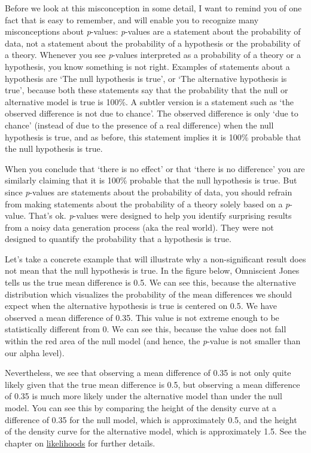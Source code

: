 \documentclass[
  oneside]{krantz}
\begin{document}
Before we look at this misconception in some detail, I want to remind you of one fact that is easy to remember, and will enable you to recognize many misconceptions about \emph{p}-values: \emph{p}-values are a statement about the probability of data, not a statement about the probability of a hypothesis or the probability of a theory. Whenever you see \emph{p}-values interpreted as a probability of a theory or a hypothesis, you know something is not right. Examples of statements about a hypothesis are `The null hypothesis is true', or `The alternative hypothesis is true', because both these statements say that the probability that the null or alternative model is true is 100\%. A subtler version is a statement such as `the observed difference is not due to chance'. The observed difference is only `due to chance' (instead of due to the presence of a real difference) when the null hypothesis is true, and as before, this statement implies it is 100\% probable that the null hypothesis is true.

When you conclude that `there is no effect' or that `there is no difference' you are similarly claiming that it is 100\% probable that the null hypothesis is true. But since \emph{p}-values are statements about the probability of data, you should refrain from making statements about the probability of a theory solely based on a \emph{p}-value. That's ok. \emph{p}-values were designed to help you identify surprising results from a noisy data generation process (aka the real world). They were not designed to quantify the probability that a hypothesis is true.

Let's take a concrete example that will illustrate why a non-significant result does not mean that the null hypothesis is true. In the figure below, Omniscient Jones tells us the true mean difference is 0.5. We can see this, because the alternative distribution which visualizes the probability of the mean differences we should expect when the alternative hypothesis is true is centered on 0.5. We have observed a mean difference of 0.35. This value is not extreme enough to be statistically different from 0. We can see this, because the value does not fall within the red area of the null model (and hence, the \emph{p}-value is not smaller than our alpha level).

Nevertheless, we see that observing a mean difference of 0.35 is not only quite likely given that the true mean difference is 0.5, but observing a mean difference of 0.35 is much more likely under the alternative model than under the null model. You can see this by comparing the height of the density curve at a difference of 0.35 for the null model, which is approximately 0.5, and the height of the density curve for the alternative model, which is approximately 1.5. See the chapter on \protect\hyperlink{likettest}{likelihoods} for further details.
\end{document}
